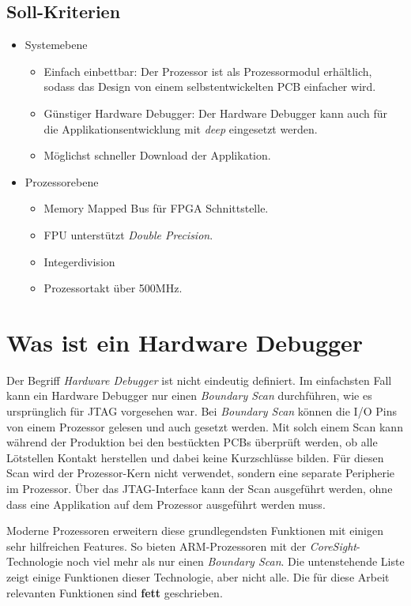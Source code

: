 \subsection{Soll-Kriterien}
\begin{itemize}
\item Systemebene
	\begin{itemize}
	\item Einfach einbettbar: Der Prozessor ist als Prozessormodul erhältlich, sodass das Design von einem selbstentwickelten PCB einfacher wird.
	\item Günstiger Hardware Debugger: Der Hardware Debugger kann auch für die Applikationsentwicklung mit \textit{deep} eingesetzt werden.
	\item Möglichst schneller Download der Applikation.
	\end{itemize}
\item Prozessorebene
	\begin{itemize}
	\item Memory Mapped Bus für FPGA Schnittstelle.
	\item FPU unterstützt \textit{Double Precision}.
	\item Integerdivision
	\item Prozessortakt über 500MHz.
	\end{itemize}
\end{itemize}


\section{Was ist ein Hardware Debugger}
Der Begriff \textit{Hardware Debugger} ist nicht eindeutig definiert.
Im einfachsten Fall kann ein Hardware Debugger nur einen \textit{Boundary Scan} durchführen, wie es ursprünglich für JTAG vorgesehen war.
Bei \textit{Boundary Scan} können die I/O Pins von einem Prozessor gelesen und auch gesetzt werden.
Mit solch einem Scan kann während der Produktion bei den bestückten PCBs überprüft werden, ob alle Lötstellen Kontakt herstellen und dabei keine Kurzschlüsse bilden.
Für diesen Scan wird der Prozessor-Kern nicht verwendet, sondern eine separate Peripherie im Prozessor.
Über das JTAG-Interface kann der Scan ausgeführt werden, ohne dass eine Applikation auf dem Prozessor ausgeführt werden muss.

Moderne Prozessoren erweitern diese grundlegendsten Funktionen mit einigen sehr hilfreichen Features.
So bieten ARM-Prozessoren mit der \textit{CoreSight}-Technologie noch viel mehr als nur einen \textit{Boundary Scan}.
Die untenstehende Liste zeigt einige Funktionen dieser Technologie, aber nicht alle.
Die für diese Arbeit relevanten Funktionen sind \textbf{fett} geschrieben.

